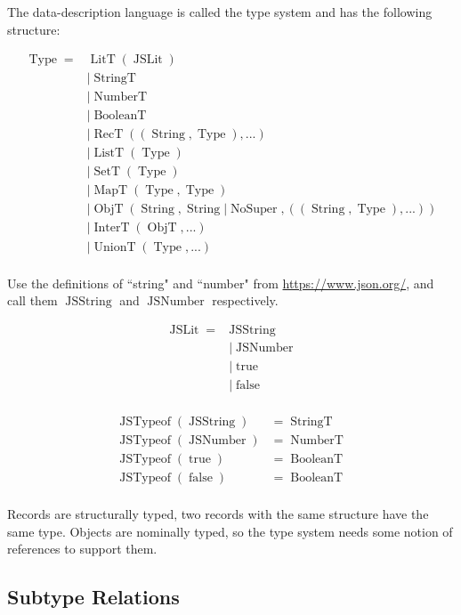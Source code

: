 \documentclass{article}
\DeclareMathOperator{\StringT}{StringT}
\DeclareMathOperator{\NumberT}{NumberT}
\DeclareMathOperator{\BooleanT}{BooleanT}
\DeclareMathOperator{\LitT}{LitT}
\DeclareMathOperator{\JSLit}{JSLit}
\DeclareMathOperator{\JSTypeof}{JSTypeof}
\DeclareMathOperator{\RecT}{RecT}
\DeclareMathOperator{\ObjT}{ObjT}
\DeclareMathOperator{\ListT}{ListT}
\DeclareMathOperator{\SetT}{SetT}
\DeclareMathOperator{\MapT}{MapT}
\DeclareMathOperator{\UnionT}{UnionT}
\DeclareMathOperator{\InterT}{InterT}
\DeclareMathOperator{\String}{String}
\DeclareMathOperator{\Type}{Type}
\DeclareMathOperator{\NoSuper}{NoSuper}
\begin{document}
The data-description language is called the type system and has 
the following structure:

\begin{align*}
\Type = &\LitT(\JSLit) \\
&|\StringT \\
&|\NumberT \\
&|\BooleanT \\
&|\RecT((\String, \Type), ...) \\
&|\ListT(\Type) \\
&|\SetT(\Type) \\
&|\MapT(\Type, \Type) \\
&|\ObjT(\String, \String | \NoSuper, ((\String, \Type), ...)) \\
&|\InterT(\ObjT, ...) \\
&|\UnionT(\Type, ...)\\
\end{align*}

Use the definitions of ``string" and ``number" from
\href{https://www.json.org/}{https://www.json.org/}, 
and call them \(\operatorname{JSString}\) and 
\(\operatorname{JSNumber}\) respectively.

\begin{align*}
    \JSLit = &\operatorname{JSString} \\
    &| \operatorname{JSNumber} \\
    &| \operatorname{true} \\
    &| \operatorname{false} \\
\end{align*}

\begin{align*}
    \JSTypeof(\operatorname{JSString}) &= \StringT \\
    \JSTypeof(\operatorname{JSNumber}) &= \NumberT \\
    \JSTypeof(\operatorname{true}) &= \BooleanT \\
    \JSTypeof(\operatorname{false}) &= \BooleanT \\
\end{align*}

Records are structurally typed, two records with the same structure have
the same type. Objects are nominally typed, so the type system needs some
notion of references to support them. 

\subsection{Subtype Relations}
\end{document}
